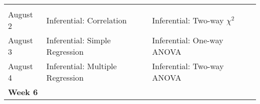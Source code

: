 \documentclass[
]{book}
\begin{document}
\begin{longtable}[]{@{}llll@{}}
\begin{minipage}[t]{0.29\columnwidth}
\strut
\end{minipage} & \begin{minipage}[t]{0.18\columnwidth}\raggedright
\strut
\end{minipage}\tabularnewline
\begin{minipage}[t]{0.09\columnwidth}\raggedright
August 2\strut
\end{minipage} & \begin{minipage}[t]{0.32\columnwidth}\raggedright
Inferential: Correlation\strut
\end{minipage} & \begin{minipage}[t]{0.29\columnwidth}\raggedright
Inferential: Two-way \(\chi^2\)\strut
\end{minipage} & \begin{minipage}[t]{0.18\columnwidth}\raggedright
\strut
\end{minipage}\tabularnewline
\begin{minipage}[t]{0.09\columnwidth}\raggedright
August 3\strut
\end{minipage} & \begin{minipage}[t]{0.32\columnwidth}\raggedright
Inferential: Simple Regression\strut
\end{minipage} & \begin{minipage}[t]{0.29\columnwidth}\raggedright
Inferential: One-way ANOVA\strut
\end{minipage} & \begin{minipage}[t]{0.18\columnwidth}\raggedright
\strut
\end{minipage}\tabularnewline
\begin{minipage}[t]{0.09\columnwidth}\raggedright
August 4\strut
\end{minipage} & \begin{minipage}[t]{0.32\columnwidth}\raggedright
Inferential: Multiple Regression\strut
\end{minipage} & \begin{minipage}[t]{0.29\columnwidth}\raggedright
Inferential: Two-way ANOVA\strut
\end{minipage} & \begin{minipage}[t]{0.18\columnwidth}\raggedright
\strut
\end{minipage}\tabularnewline
\begin{minipage}[t]{0.09\columnwidth}\raggedright
\textbf{Week 6}\strut
\end{minipage} & \begin{minipage}[t]{0.32\columnwidth}\raggedright
\strut
\end{minipage} & \begin{minipage}[t]{0.29\columnwidth}\raggedright

\end{minipage}
\end{longtable}
\end{document}
